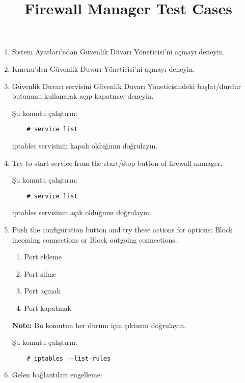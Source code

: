 \documentclass[a4paper,10pt]{article}
\title{Firewall Manager Test Cases}
\begin{document}
\maketitle

\begin{enumerate}
    \item Sistem Ayarları'ndan Güvenlik Duvarı Yöneticisi'ni açmayı deneyin.
    \item Kmenu'den Güvenlik Duvarı Yöneticisi'ni açmayı deneyin.
    \item Güvenlik Duvarı servisini Güvenlik Duvarı Yöneticisindeki başlat/durdur butonunu kullanarak açıp kapatmay deneyin.

    Şu komutu çalıştırın:

\begin{verbatim}
    # service list
\end{verbatim} 

    iptables servisinin kapalı olduğunu doğrulayın.

    \item Try to start service from the start/stop button of firewall manager.

        Şu komutu çalıştırın:

\begin{verbatim}
    # service list
\end{verbatim}

       iptables servisinin açık olduğunu doğrulayın.

\item Push the configuration button and try these actions for options: Block incoming connections or Block outgoing connections.
    \begin{enumerate}
        \item Port ekleme
        \item Port silme
        \item Port açmak
        \item Port kapatmak
    \end{enumerate}

\textbf{Note:} Bu komutun her durum için çıktısını doğrulayın.

Şu komutu çalıştırın:

\begin{verbatim}
    # iptables --list-rules
\end{verbatim} 

\item Gelen bağlantıları engelleme:


\end{enumerate}
\end{document}
